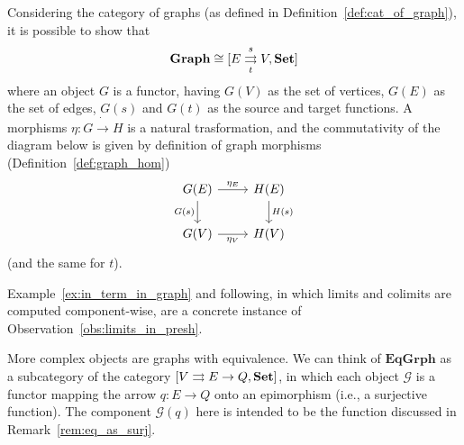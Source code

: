 \documentclass[a4paper, twoside,openright]{report}
\theoremstyle{plain}
\theoremstyle{definition}
\begin{document}
Considering the category of graphs (as defined in Definition~\ref{def:cat_of_graph}), it is possible to show that 
$$\mathbf{Graph} \cong [E \mathrel{\mathop{\rightrightarrows}^{s}_{t}} V , \mathbf{Set}]$$
where an object $G$ is a functor, having $G(V)$ as the set of vertices, $G(E)$ as the set of edges, $G(s)$ and $G(t)$ as the source and target functions. A morphisms $\eta: G \dot\rightarrow H$ is a natural trasformation, and the commutativity of the diagram below is given by definition of graph morphisms (Definition~\ref{def:graph_hom})
$$
    \begin{tikzcd}
        G(E) \arrow[r, "{\eta_E}"] \arrow[d, "G(s)"swap] & H(E) \arrow[d, "H(s)"] \\
        G(V) \arrow[r, "{\eta_V}"swap] & H(V)
    \end{tikzcd}
$$
(and the same for $t$).

Example~\ref{ex:in_term_in_graph} and following, in which limits and colimits are computed component-wise, are a concrete instance of Observation~\ref{obs:limits_in_presh}.

More complex objects are graphs with equivalence. We can think of $\mathbf{EqGrph}$ as a subcategory of the category $[V \rightrightarrows E \rightarrow Q, \mathbf{Set}]$, in which each object $\mathcal{G}$ is a functor mapping the arrow $q: E \rightarrow Q$ onto an epimorphism (i.e., a surjective function). The component $\mathcal{G}(q)$ here is intended to be the function discussed in Remark~\ref{rem:eq_as_surj}. 





\end{document}
